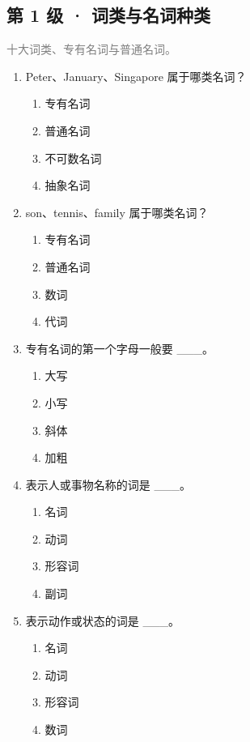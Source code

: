 \documentclass[11pt,a4paper]{ctexart}
\begin{document}
\subsection*{第 1 级 · 词类与名词种类}
\noindent\textcolor{gray}{十大词类、专有名词与普通名词。}\par\smallskip
\begin{enumerate}[leftmargin=*,itemsep=4pt]
\item Peter、January、Singapore 属于哪类名词？
\begin{enumerate}[label=\Alph*.,leftmargin=2em,itemsep=1pt,topsep=2pt]
\item 专有名词
\item 普通名词
\item 不可数名词
\item 抽象名词
\end{enumerate}
\item son、tennis、family 属于哪类名词？
\begin{enumerate}[label=\Alph*.,leftmargin=2em,itemsep=1pt,topsep=2pt]
\item 专有名词
\item 普通名词
\item 数词
\item 代词
\end{enumerate}
\item 专有名词的第一个字母一般要 \_\_\_。
\begin{enumerate}[label=\Alph*.,leftmargin=2em,itemsep=1pt,topsep=2pt]
\item 大写
\item 小写
\item 斜体
\item 加粗
\end{enumerate}
\item 表示人或事物名称的词是 \_\_\_。
\begin{enumerate}[label=\Alph*.,leftmargin=2em,itemsep=1pt,topsep=2pt]
\item 名词
\item 动词
\item 形容词
\item 副词
\end{enumerate}
\item 表示动作或状态的词是 \_\_\_。
\begin{enumerate}[label=\Alph*.,leftmargin=2em,itemsep=1pt,topsep=2pt]
\item 名词
\item 动词
\item 形容词
\item 数词

\end{enumerate}
\end{enumerate}
\end{document}
